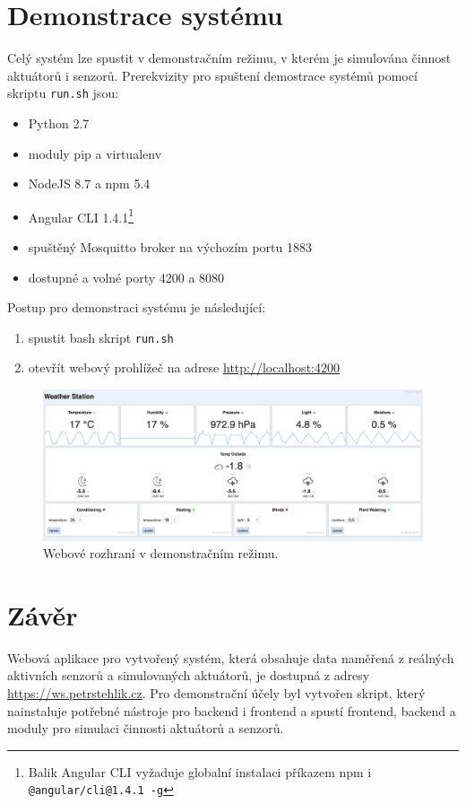 \documentclass[11pt,a4paper]{article}
\begin{document}
\section{Demonstrace systému}\label{sec:res}
Celý systém lze spustit v demonstračním režimu, v kterém je simulována činnost aktuátorů i senzorů. Prerekvizity pro spuštení demostrace systémů pomocí skriptu \texttt{run.sh} jsou:
\begin{itemize}
    \item Python 2.7
    \item moduly pip a virtualenv
    \item NodeJS 8.7 a npm 5.4
    \item Angular CLI 1.4.1\footnote{Balik Angular CLI vyžaduje globalní instalaci příkazem npm i \texttt{@angular/cli@1.4.1 -g}}
    \item spuštěný Mosquitto broker na výchozím portu 1883
    \item dostupné a volné porty 4200 a 8080
\end{itemize}
Postup pro demonstraci systému je následující:
\begin{enumerate}
    \item spustit bash skript \texttt{run.sh}
    \item otevřít webový prohlížeč na adrese \url{http://localhost:4200}
\end{enumerate}

\begin{figure}[htb]
    \centering
    \includegraphics[width=0.75\linewidth]{web}
    \caption{Webové rozhraní v demonstračním režimu.}
    \label{fig:sw-scheme}
\end{figure}

\section{Závěr}\label{sec:sum}
Webová aplikace pro vytvořený systém, která obsahuje data naměřená z reálných aktivních senzorů a simulovaných aktuátorů, je dostupná z adresy \url{https://ws.petrstehlik.cz}. Pro demonstrační účely byl vytvořen skript, který nainstaluje potřebné nástroje pro backend i frontend a spustí frontend, backend a moduly pro simulaci činnosti aktuátorů a senzorů.
\end{document}
